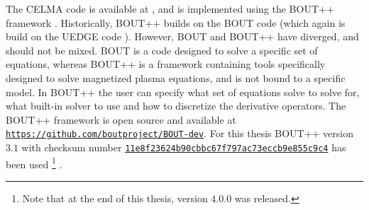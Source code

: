 \label{chap:BOUT++}
The CELMA code is available at \celmaProject, and is implemented using the BOUT++ framework \cite{Dudson2009,Dudson2014a,Dudson2016}.
Historically, BOUT++ builds on the BOUT code \cite{Xu1998} (which again is build on the UEDGE code \cite{Rognlien1996}).
However, BOUT and BOUT++ have diverged, and should not be mixed.
BOUT is a code designed to solve a specific set of equations, whereas BOUT++ is a framework containing tools specifically designed to solve magnetized plasma equations, and is not bound to a specific model.
In BOUT++ the user can specify what set of equations solve to solve for, what built-in solver to use and how to discretize the derivative operators.
The BOUT++ framework is open source and available at \href{https://github.com/boutproject/BOUT-dev}{\texttt{https://github.com/boutproject/BOUT-dev}}.
For this thesis BOUT++ version $3.1$ with checksum number \href{https://github.com/boutproject/BOUT-dev/releases/tag/v3.1}{\texttt{11e8f23624b90cbbc67f797ac73eccb9e855c9c4}} has been used%
%
\footnote{Note that at the end of this thesis, version $4.0.0$ was released.}%
%
.
